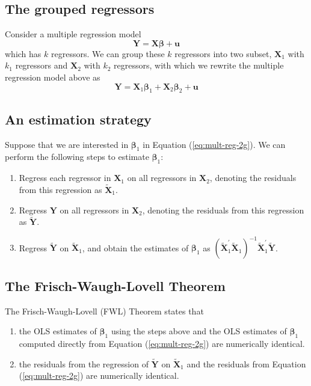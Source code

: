 \documentclass[a4paper,11pt]{article}
\begin{document}
\subsection{The grouped regressors}
\label{sec:org8985439}
Consider a multiple regression model
\begin{equation*}
\mathbf{Y} = \mathbf{X}\boldsymbol{\beta} + \mathbf{u}
\end{equation*}
which has \(k\) regressors. We can group these \(k\) regressors into two
subset, \(\mathbf{X}_1\) with \(k_1\) regressors and \(\mathbf{X}_2\) with
\(k_2\) regressors, with which we rewrite the multiple regression model
above as
\begin{equation}
\label{eq:mult-reg-2g}
\mathbf{Y} = \mathbf{X}_1\boldsymbol{\beta}_1 + \mathbf{X}_2 \boldsymbol{\beta}_2 + \mathbf{u}
\end{equation}

\subsection{An estimation strategy}
\label{sec:org05ae3c3}
Suppose that we are interested in \(\boldsymbol{\beta}_1\) in Equation
(\ref{eq:mult-reg-2g}). We can perform the following steps to
estimate \(\boldsymbol{\beta}_1\):
\begin{enumerate}
\item Regress each regressor in \(\mathbf{X}_1\) on all regressors in \(\mathbf{X}_2\),
denoting the residuals from this regression as
\(\widetilde{\mathbf{X}}_1\).
\item Regress \(\mathbf{Y}\) on all regressors in \(\mathbf{X}_2\), denoting
the residuals from this regression as \(\widetilde{\mathbf{Y}}\).
\item Regress \(\widetilde{\mathbf{Y}}\) on \(\widetilde{\mathbf{X}}_1\), and
obtain the estimates of \(\boldsymbol{\beta}_1\) as
\((\widetilde{\mathbf{X}}_1^{\prime} \widetilde{\mathbf{X}}_1)^{-1}
   \widetilde{\mathbf{X}}_1^{\prime} \widetilde{\mathbf{Y}}\).
\end{enumerate}

\subsection{The Frisch-Waugh-Lovell Theorem}
\label{sec:org4d1d229}
The Frisch-Waugh-Lovell (FWL) Theorem states that
\begin{enumerate}
\item the OLS estimates of
\(\boldsymbol{\beta}_1\) using the steps above and the OLS estimates of
\(\boldsymbol{\beta}_1\) computed directly from Equation
(\ref{eq:mult-reg-2g}) are numerically identical.
\item the residuals from the regression of \(\widetilde{\mathbf{Y}}\) on
\(\widetilde{\mathbf{X}}_1\) and the residuals from Equation
(\ref{eq:mult-reg-2g}) are numerically identical.
\end{enumerate}
\end{document}

